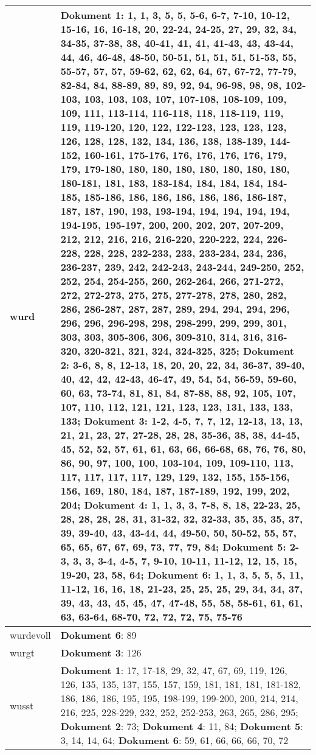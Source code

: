 \documentclass[a5paper]{article}
\begin{document}
\begin{longtable}[l]{|l|p{3in}|}
wurd & \textbf{Dokument 1}: 1, 1, 3, 5, 5, 5-6, 6-7, 7-10, 10-12, 15-16, 16, 16-18, 20, 22-24, 24-25, 27, 29, 32, 34, 34-35, 37-38, 38, 40-41, 41, 41, 41-43, 43, 43-44, 44, 46, 46-48, 48-50, 50-51, 51, 51, 51, 51-53, 55, 55-57, 57, 57, 59-62, 62, 62, 64, 67, 67-72, 77-79, 82-84, 84, 88-89, 89, 89, 92, 94, 96-98, 98, 98, 102-103, 103, 103, 103, 107, 107-108, 108-109, 109, 109, 111, 113-114, 116-118, 118, 118-119, 119, 119, 119-120, 120, 122, 122-123, 123, 123, 123, 126, 128, 128, 132, 134, 136, 138, 138-139, 144-152, 160-161, 175-176, 176, 176, 176, 176, 179, 179, 179-180, 180, 180, 180, 180, 180, 180, 180, 180-181, 181, 183, 183-184, 184, 184, 184, 184-185, 185-186, 186, 186, 186, 186, 186, 186-187, 187, 187, 190, 193, 193-194, 194, 194, 194, 194, 194-195, 195-197, 200, 200, 202, 207, 207-209, 212, 212, 216, 216, 216-220, 220-222, 224, 226-228, 228, 228, 232-233, 233, 233-234, 234, 236, 236-237, 239, 242, 242-243, 243-244, 249-250, 252, 252, 254, 254-255, 260, 262-264, 266, 271-272, 272, 272-273, 275, 275, 277-278, 278, 280, 282, 286, 286-287, 287, 287, 289, 294, 294, 294, 296, 296, 296, 296-298, 298, 298-299, 299, 299, 301, 303, 303, 305-306, 306, 309-310, 314, 316, 316-320, 320-321, 321, 324, 324-325, 325; \textbf{Dokument 2}: 3-6, 8, 8, 12-13, 18, 20, 20, 22, 34, 36-37, 39-40, 40, 42, 42, 42-43, 46-47, 49, 54, 54, 56-59, 59-60, 60, 63, 73-74, 81, 81, 84, 87-88, 88, 92, 105, 107, 107, 110, 112, 121, 121, 123, 123, 131, 133, 133, 133; \textbf{Dokument 3}: 1-2, 4-5, 7, 7, 12, 12-13, 13, 13, 21, 21, 23, 27, 27-28, 28, 28, 35-36, 38, 38, 44-45, 45, 52, 52, 57, 61, 61, 63, 66, 66-68, 68, 76, 76, 80, 86, 90, 97, 100, 100, 103-104, 109, 109-110, 113, 117, 117, 117, 117, 129, 129, 132, 155, 155-156, 156, 169, 180, 184, 187, 187-189, 192, 199, 202, 204; \textbf{Dokument 4}: 1, 1, 3, 3, 7-8, 8, 18, 22-23, 25, 28, 28, 28, 28, 31, 31-32, 32, 32-33, 35, 35, 35, 37, 39, 39-40, 43, 43-44, 44, 49-50, 50, 50-52, 55, 57, 65, 65, 67, 67, 69, 73, 77, 79, 84; \textbf{Dokument 5}: 2-3, 3, 3, 3-4, 4-5, 7, 9-10, 10-11, 11-12, 12, 15, 15, 19-20, 23, 58, 64; \textbf{Dokument 6}: 1, 1, 3, 5, 5, 5, 11, 11-12, 16, 16, 18, 21-23, 25, 25, 25, 29, 34, 34, 37, 39, 43, 43, 45, 45, 47, 47-48, 55, 58, 58-61, 61, 61, 63, 63-64, 68-70, 72, 72, 72, 75, 75-76 \\
\hline
wurdevoll & \textbf{Dokument 6}: 89 \\
\hline
wurgt & \textbf{Dokument 3}: 126 \\
\hline
wusst & \textbf{Dokument 1}: 17, 17-18, 29, 32, 47, 67, 69, 119, 126, 126, 135, 135, 137, 155, 157, 159, 181, 181, 181, 181-182, 186, 186, 186, 195, 195, 198-199, 199-200, 200, 214, 214, 216, 225, 228-229, 232, 252, 252-253, 263, 265, 286, 295; \textbf{Dokument 2}: 73; \textbf{Dokument 4}: 11, 84; \textbf{Dokument 5}: 3, 14, 14, 64; \textbf{Dokument 6}: 59, 61, 66, 66, 66, 70, 72 \\

\end{longtable}
\end{document}

